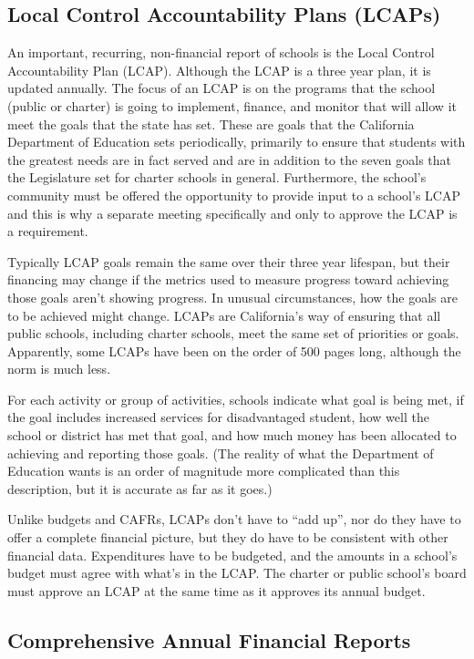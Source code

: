 \subsection{Local Control Accountability Plans (LCAPs)}\label{sec:lcaps}\indent
An important, recurring, non-financial report of schools is the Local Control Accountability Plan (LCAP). Although the LCAP is a three year plan, it is updated annually. The focus of an LCAP is on the programs that the school (public or charter) is going to implement, finance, and monitor that will allow it meet the goals that the state has set. These are goals that the California Department of Education sets periodically, primarily to ensure that students with the greatest needs are in fact served and are in addition to the seven goals that the Legislature set for charter schools in general. Furthermore, the school's community must be offered the opportunity to provide input to a school's LCAP and this is why a separate meeting specifically and only to approve the LCAP is a requirement.

Typically LCAP goals remain the same over their three year lifespan, but their financing may change if the metrics used to measure progress toward achieving those goals aren't showing progress. In unusual circumstances, how the goals are to be achieved might change. LCAPs are California's way of ensuring that all public schools, including charter schools, meet the same set of priorities or goals. Apparently, some LCAPs have been on the order of 500 pages long, although the norm is much less.

For each activity or group of activities, schools indicate what goal is being met, if the goal includes increased services for disadvantaged student, how well the school or district has met that goal, and how much money has been allocated to achieving and reporting those goals. (The reality of what the Department of Education wants is an order of magnitude more complicated than this description, but it is accurate as far as it goes.)

Unlike budgets and CAFRs, LCAPs don't have to ``add up'', nor do they have to offer a complete financial picture, but they do have to be consistent with other financial data. Expenditures have to be budgeted, and the amounts in a school's budget must agree with what's in the LCAP\@. The charter or public school's board must approve an LCAP at the same time as it approves its annual budget. %

\subsection{Comprehensive Annual Financial Reports}\indent


